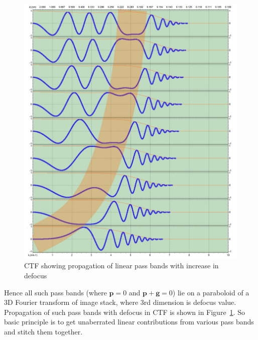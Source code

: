 \begin{figure}[htp]
    \centering
    \includegraphics[width=\textwidth]{figures/ctfparabola.pdf}
    \caption{CTF showing propagation of linear pass bands with increase in defocus}
    \label{fig:ctfparabola}
\end{figure}


Hence all such pass bands (where $\boldsymbol{p}=0$ and $\boldsymbol{p}+\boldsymbol{g}=0$) lie on a paraboloid of a 3D Fourier transform of image stack, where 3rd dimension is defocus value.
Propagation of such pass bands with defocus in CTF is shown in Figure~\ref{fig:ctfparabola}. 
So basic principle is to get unaberrated linear contributions from various pass bands and stitch them together.


